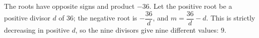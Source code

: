 The roots have opposite signs and product $-36$. Let the positive root be a positive divisor $d$ of 36; the negative root is $-\dfrac{36}{d}$, and $m=\dfrac{36}{d}-d$. This is strictly decreasing in positive $d$, so the nine divisors give nine different values: $\boxed{9}$.
